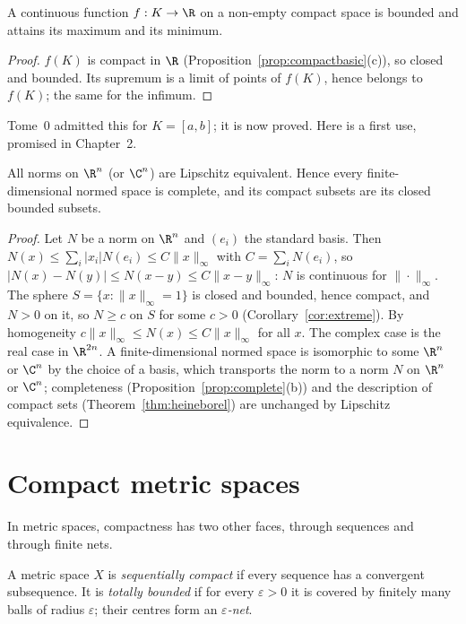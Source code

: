 \begin{corollary}\label{cor:extreme}
A continuous function $f:K\to\R$ on a non-empty compact space is bounded and attains its maximum and its minimum.
\end{corollary}
\begin{proof}
$f(K)$ is compact in $\R$ (Proposition~\ref{prop:compactbasic}(c)), so closed and bounded. Its supremum is a limit of points of $f(K)$, hence belongs to
$f(K)$; the same for the infimum.
\end{proof}

Tome~0 admitted this for $K=[a,b]$; it is now proved. Here is a first use, promised in Chapter~2.

\begin{corollary}\label{cor:norms}
All norms on $\R^n$ (or $\C^n$) are Lipschitz equivalent. Hence every finite-dimensional normed space is complete, and its compact subsets are its closed
bounded subsets.
\end{corollary}
\begin{proof}
Let $N$ be a norm on $\R^n$ and $(e_i)$ the standard basis. Then $N(x)\le\sum_i|x_i|N(e_i)\le C\|x\|_\infty$ with $C=\sum_iN(e_i)$, so $|N(x)-N(y)|\le N(x-y)\le C\|x-y\|_\infty$:
$N$ is continuous for $\|\cdot\|_\infty$. The sphere $S=\{x:\|x\|_\infty=1\}$ is closed and bounded, hence compact, and $N>0$ on it, so $N\ge c$ on $S$ for some
$c>0$ (Corollary~\ref{cor:extreme}). By homogeneity $c\|x\|_\infty\le N(x)\le C\|x\|_\infty$ for all $x$. The complex case is the real case in $\R^{2n}$. A finite-dimensional
normed space is isomorphic to some $\R^n$ or $\C^n$ by the choice of a basis, which transports the norm to a norm $N$ on $\R^n$ or $\C^n$; completeness
(Proposition~\ref{prop:complete}(b)) and the description of compact sets (Theorem~\ref{thm:heineborel}) are unchanged by Lipschitz equivalence.
\end{proof}

\section{Compact metric spaces}

In metric spaces, compactness has two other faces, through sequences and through finite nets.

\begin{definition}
A metric space $X$ is \emph{sequentially compact} if every sequence has a convergent subsequence. It is \emph{totally bounded} if for every $\varepsilon>0$ it is
covered by finitely many balls of radius $\varepsilon$; their centres form an \emph{$\varepsilon$-net}.
\end{definition}

